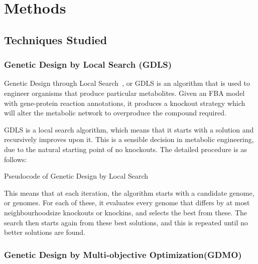 \chapter{Methods}

\section{Techniques Studied}

\subsection{Genetic Design by Local Search (GDLS)}
Genetic Design through Local Search~\cite{Lun2009}, or GDLS is an algorithm that is used to engineer organisms that produce particular metabolites. 
Given an FBA model with gene-protein reaction annotations, it produces a knockout strategy which will alter the metabolic network to overproduce the compound required.

GDLS is a local search algorithm, which means that it starts with a solution and recursively improves upon it. 
This is a sensible decision in metabolic engineering, due to the natural starting point of no knockouts. 
The detailed procedure is as follows:

\begin{algorithm}
\caption{Pseudocode of Genetic Design by Local Search}
\label{alg:GDLS}
\begin{algorithmic}
\EndWhile
\end{algorithmic}
\end{algorithm}

This means that at each iteration, the algorithm starts with a candidate genome, or genomes. For each of these, it evaluates every genome that differs by at most neighbourhoodsize knockouts or knockins, and selects the best from these. The search then starts again from these best solutions, and this is repeated until no better solutions are found. 

\subsection{Genetic Design by Multi-objective Optimization(GDMO)} 

